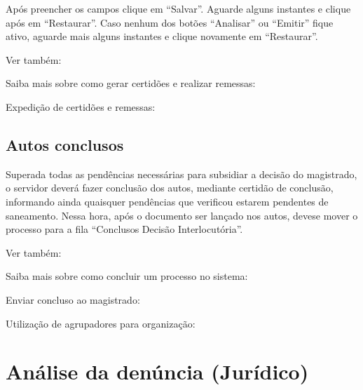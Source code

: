 \documentclass[letterpaper,10pt,brazil]{sphinxmanual}
\begin{document}
\sphinxAtStartPar
Após preencher os campos clique em “Salvar”. Aguarde alguns instantes e clique após em “Restaurar”. Caso nenhum dos botões “Analisar” ou “Emitir” fique ativo, aguarde mais alguns instantes e clique novamente em “Restaurar”.


\begin{sphinxseealso}{Ver também:}

\sphinxAtStartPar
Saiba mais sobre como gerar certidões e realizar remessas:

\sphinxAtStartPar
Expedição de certidões e remessas: {\hyperref[\detokenize{projud_35_enviarconcluso::doc}]{}}


\end{sphinxseealso}



\subsection{Autos conclusos}
\label{\detokenize{01processos_entrados:autos-conclusos}}
\sphinxAtStartPar
Superada todas as pendências necessárias para subsidiar a decisão do magistrado, o servidor deverá fazer conclusão dos autos, mediante certidão de conclusão, informando ainda quaisquer pendências que verificou estarem pendentes de saneamento. Nessa hora, após o documento ser lançado nos autos, deve\sphinxhyphen{}se mover o processo para a fila “Conclusos \sphinxhyphen{} Decisão Interlocutória”.


\begin{sphinxseealso}{Ver também:}

\sphinxAtStartPar
Saiba mais sobre como concluir um processo no sistema:

\sphinxAtStartPar
Enviar concluso ao magistrado: {\hyperref[\detokenize{projud_35_enviarconcluso::doc}]{}}

\sphinxAtStartPar
Utilização de agrupadores para organização: {\hyperref[\detokenize{projud_51_agrupador::doc}]{}}


\end{sphinxseealso}


\sphinxstepscope


\section{Análise da denúncia (Jurídico)}
\label{\detokenize{02analisedenuncia:analise-da-denuncia-juridico}}\label{\detokenize{02analisedenuncia::doc}}
\end{document}
